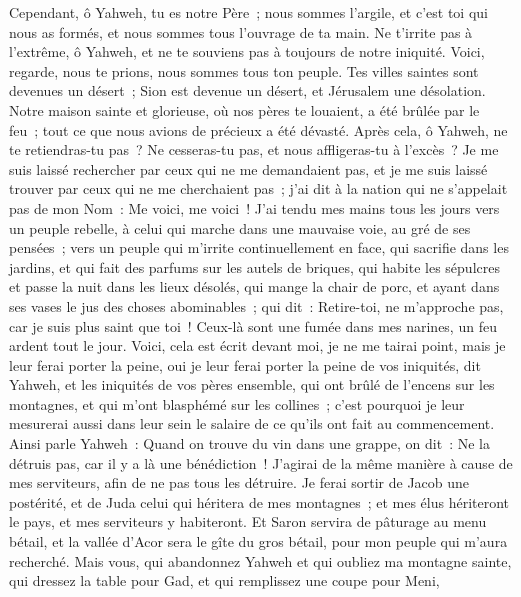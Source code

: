 \begin{multicols}{2}
Cependant, ô Yahweh, tu es notre Père~; nous sommes l'argile, et c'est toi qui nous as formés, et nous sommes tous l'ouvrage de ta main.
Ne t'irrite pas à l'extrême, ô Yahweh, et ne te souviens pas à toujours de notre iniquité. Voici, regarde, nous te prions, nous sommes tous ton peuple.
Tes villes saintes sont devenues un désert~; Sion est devenue un désert, et Jérusalem une désolation.
Notre maison sainte et glorieuse, où nos pères te louaient, a été brûlée par le feu~; tout ce que nous avions de précieux a été dévasté.
Après cela, ô Yahweh, ne te retiendras-tu pas~? Ne cesseras-tu pas, et nous affligeras-tu à l'excès~?
\VerseOne{}Je me suis laissé rechercher par ceux qui ne me demandaient pas, et je me suis laissé trouver par ceux qui ne me cherchaient pas~; j'ai dit à la nation qui ne s'appelait pas de mon Nom~: Me voici, me voici~!
J'ai tendu mes mains tous les jours vers un peuple rebelle, à celui qui marche dans une mauvaise voie, au gré de ses pensées~;
vers un peuple qui m'irrite continuellement en face, qui sacrifie dans les jardins, et qui fait des parfums sur les autels de briques,
qui habite les sépulcres et passe la nuit dans les lieux désolés, qui mange la chair de porc, et ayant dans ses vases le jus des choses abominables~;
qui dit~: Retire-toi, ne m'approche pas, car je suis plus saint que toi~! Ceux-là sont une fumée dans mes narines, un feu ardent tout le jour.
Voici, cela est écrit devant moi, je ne me tairai point, mais je leur ferai porter la peine, oui je leur ferai porter la peine
de vos iniquités, dit Yahweh, et les iniquités de vos pères ensemble, qui ont brûlé de l'encens sur les montagnes, et qui m'ont blasphémé sur les collines~; c'est pourquoi je leur mesurerai aussi dans leur sein le salaire de ce qu'ils ont fait au commencement.
Ainsi parle Yahweh~: Quand on trouve du vin dans une grappe, on dit~: Ne la détruis pas, car il y a là une bénédiction~! J'agirai de la même manière à cause de mes serviteurs, afin de ne pas tous les détruire.
Je ferai sortir de Jacob une postérité, et de Juda celui qui héritera de mes montagnes~; et mes élus hériteront le pays, et mes serviteurs y habiteront.
Et Saron servira de pâturage au menu bétail, et la vallée d'Acor sera le gîte du gros bétail, pour mon peuple qui m'aura recherché.
Mais vous, qui abandonnez Yahweh et qui oubliez ma montagne sainte, qui dressez la table pour Gad, et qui remplissez une coupe pour Meni,

\end{multicols}
